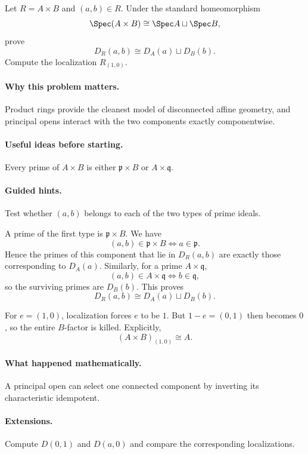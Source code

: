 \begin{problem}
Let $R=A\times B$ and $(a,b)\in R$.  Under the standard homeomorphism
\[
\Spec(A\times B)\cong\Spec A\sqcup\Spec B,
\]
prove
\[
D_R(a,b)
\cong
D_A(a)\sqcup D_B(b).
\]
Compute the localization $R_{(1,0)}$.
\end{problem}

\paragraph{Why this problem matters.}
Product rings provide the cleanest model of disconnected affine geometry, and principal
opens interact with the two components exactly componentwise.

\paragraph{Useful ideas before starting.}
Every prime of $A\times B$ is either $\mathfrak p\times B$ or $A\times\mathfrak q$.

\paragraph{Guided hints.}
Test whether $(a,b)$ belongs to each of the two types of prime ideals.

\begin{solution}
A prime of the first type is $\mathfrak p\times B$.  We have
\[
(a,b)\in\mathfrak p\times B
\iff a\in\mathfrak p.
\]
Hence the primes of this component that lie in $D_R(a,b)$ are exactly those corresponding
to $D_A(a)$.  Similarly, for a prime $A\times\mathfrak q$,
\[
(a,b)\in A\times\mathfrak q
\iff b\in\mathfrak q,
\]
so the surviving primes are $D_B(b)$.  This proves
\[
D_R(a,b)\cong D_A(a)\sqcup D_B(b).
\]

For $e=(1,0)$, localization forces $e$ to be $1$.  But $1-e=(0,1)$ then becomes $0$, so the
entire $B$-factor is killed.  Explicitly,
\[
(A\times B)_{(1,0)}\cong A.
\]
\end{solution}

\paragraph{What happened mathematically.}
A principal open can select one connected component by inverting its characteristic
idempotent.

\paragraph{Extensions.}
Compute $D(0,1)$ and $D(a,0)$ and compare the corresponding localizations.

